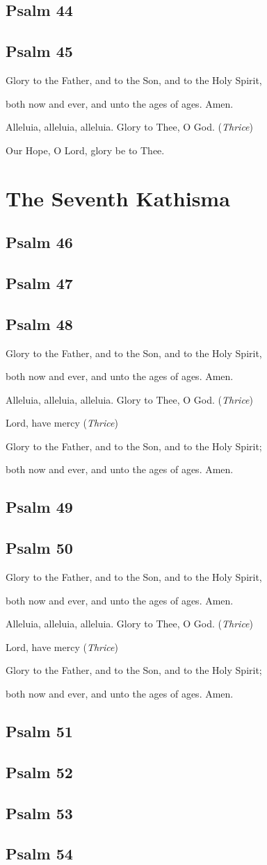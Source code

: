 \documentclass[12pt,openany]{book}
\newcommand{\kathismabreak}{
  \medskip
  \begin{center}
  \begin{footnotesize}
  Glory to the Father, and to the Son, and to the Holy Spirit,
  
  both now and ever, and unto the ages of ages. Amen.

  Alleluia, alleluia, alleluia. Glory to Thee, O God. (\textit{Thrice})

  Lord, have mercy (\textit{Thrice})

  Glory to the Father, and to the Son, and to the Holy Spirit;
  
  both now and ever, and unto the ages of ages. Amen.
  \end{footnotesize}
  \end{center}
  \smallbreak
}
\newcommand{\kathismaend}{
  \medskip
  \begin{center}
  \begin{footnotesize}
  Glory to the Father, and to the Son, and to the Holy Spirit,
  
  both now and ever, and unto the ages of ages. Amen.

  Alleluia, alleluia, alleluia. Glory to Thee, O God. (\textit{Thrice})

  Our Hope, O Lord, glory be to Thee.
  \end{footnotesize}
  \end{center}
  \smallbreak
}
\begin{document}
\section{Psalm 44}

\smallskip
\section{Psalm 45}


\kathismaend

\chapter*{The Seventh Kathisma}
\smallskip
\section{Psalm 46}

\smallskip
\section{Psalm 47}

\smallskip
\section{Psalm 48}


\kathismabreak
\bigskip
\section{Psalm 49}

\smallskip
\pagebreak %
\section{Psalm 50}


\kathismabreak
\section{Psalm 51}

\section{Psalm 52}

\section{Psalm 53}

\section{Psalm 54}

\end{document}
